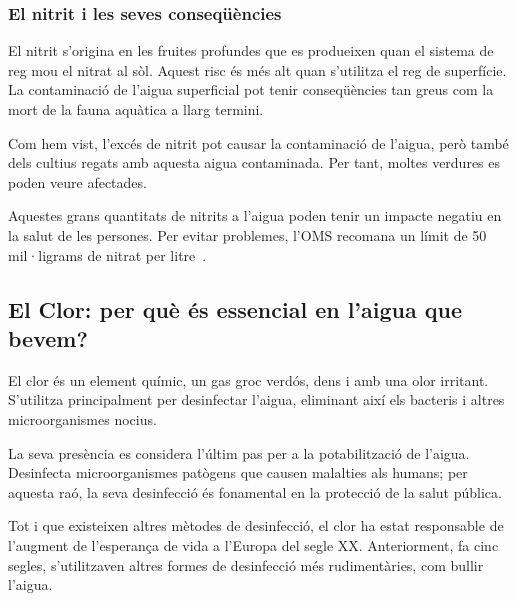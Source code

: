 \subsubsection{El nitrit i les seves conseqüències}
El nitrit s'origina en les fruites profundes que es produeixen quan el sistema de reg mou el nitrat al sòl. Aquest risc és més alt quan s'utilitza el reg de superfície. La contaminació de l'aigua superficial pot tenir conseqüències tan greus com la mort de la fauna aquàtica a llarg termini.

Com hem vist, l'excés de nitrit pot causar la contaminació de l'aigua, però també dels cultius regats amb aquesta aigua contaminada. Per tant, moltes verdures es poden veure afectades.

Aquestes grans quantitats de nitrits a l'aigua poden tenir un impacte negatiu en la salut de les persones. Per evitar problemes, l'OMS recomana un límit de 50 mil·ligrams de nitrat per litre~\cite{Scielo}.


\subsection{El Clor: per què és essencial en l’aigua que bevem?} \label{subsec:clor}
El clor és un element químic, un gas groc verdós, dens i amb una olor irritant. S'utilitza principalment per desinfectar l'aigua, eliminant així els bacteris i altres microorganismes nocius.

La seva presència es considera l'últim pas per a la potabilització de l'aigua. Desinfecta microorganismes patògens que causen malalties als humans; per aquesta raó, la seva desinfecció és fonamental en la protecció de la salut pública.

Tot i que existeixen altres mètodes de desinfecció, el clor ha estat responsable de l'augment de l'esperança de vida a l'Europa del segle XX. Anteriorment, fa cinc segles, s'utilitzaven altres formes de desinfecció més rudimentàries, com bullir l'aigua.

